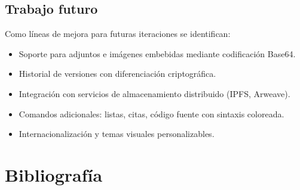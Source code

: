 \documentclass[12pt,letterpaper]{article}
\begin{document}
\subsection{Trabajo futuro}
Como líneas de mejora para futuras iteraciones se identifican:

\begin{itemize}
    \item Soporte para adjuntos e imágenes embebidas mediante codificación Base64.
    \item Historial de versiones con diferenciación criptográfica.
    \item Integración con servicios de almacenamiento distribuido (IPFS, Arweave).
    \item Comandos adicionales: listas, citas, código fuente con sintaxis coloreada.
    \item Internacionalización y temas visuales personalizables.
\end{itemize}

\newpage
\section{Bibliografía}

\printbibliography
\end{document}
